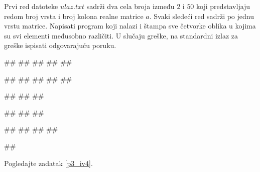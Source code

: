 \begin{Exercise}[label=p3_x6]         
Prvi red datoteke $ulaz.txt$ sadrži dva cela broja između $2$ i $50$
koji predstavljaju redom broj vrsta i broj kolona realne matrice
$a$. Svaki sledeći red sadrži po jednu vrstu matrice. Napisati
program koji nalazi i štampa sve četvorke oblika
 u kojima su svi
elementi međusobno različiti.
U slučaju greške, na standardni izlaz za greške ispisati odgovarajuću poruku.

\begin{minitest}
\begin{upotreba}{1}
##
##
##
##
##

#\naslovIzlaz#
##
##
##
##
\end{upotreba}
\end{minitest}
\begin{minitest}
\begin{upotreba}{2}
##
##
##

#\naslovIzlazZaGresku#
##
##
\end{upotreba}
\end{minitest}
\begin{minitest}
\begin{upotreba}{3}
##
##
##
##

#\naslovIzlaz#
\end{upotreba}
\end{minitest}
\end{Exercise}
\begin{Answer}[ref=p3_x6]
Pogledajte zadatak \ref{p3_iv4}.
\end{Answer}


